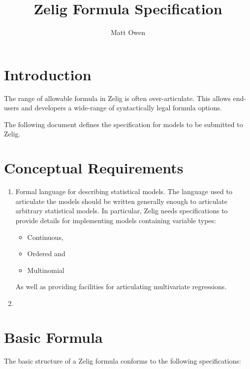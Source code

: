 \documentclass{article}
\title{Zelig Formula Specification}
\author{Matt Owen}
\begin{document}
\maketitle

\section{Introduction}

The range of allowable formula in Zelig is often over-articulate. This allows
end-users and developers a wide-range of syntactically legal formula options.

The following document defines the specification for models to be submitted to
Zelig.


\section{Conceptual Requirements}
\label{Conceptual-Requirements}

\begin{enumerate}
  \item Formal language for describing statistical models. The language used to
    articulate the models should be written generally enough to articulate 
    arbitrary statistical models. In particular, Zelig needs specifications to
    provide details for implementing models containing variable types:
    \begin{itemize}
      \item Continuous,
      \item Ordered and
      \item Multinomial
    \end{itemize}

    As well as providing facilities for articulating multivariate regressions.

  \item 
\end{enumerate}


\section{Basic Formula}

The basic structure of a Zelig formula conforms to the following specifications:
\end{document}

